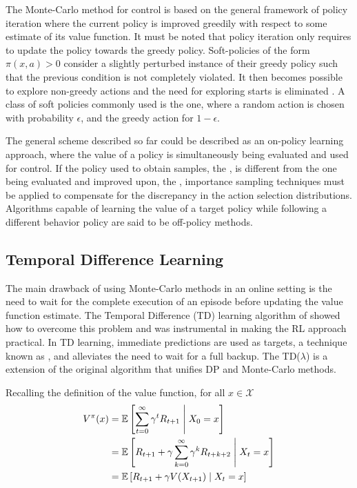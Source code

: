 The Monte-Carlo method for control is based on the general framework of policy
iteration where the current policy is improved greedily with respect to some
estimate of its value function. It must be noted that policy iteration only requires to update the policy
towards the greedy policy.  Soft-policies of the form $\pi(x, a) > 0$ consider a slightly perturbed instance
of their greedy policy such that the previous condition is not completely violated. It then becomes possible to explore non-greedy actions and the need for exploring starts is eliminated \parencite{SuttonBarto1998}. A class of soft policies commonly used is the  one, where a random action is chosen with probability $\epsilon$, and the greedy action for $1 - \epsilon$. 

The  general scheme described so far could be described as an on-policy learning approach,
where the value of a policy is simultaneously being evaluated and used for control.
If the policy used to obtain samples, the , is different from
the one being evaluated and improved upon, the ,
importance sampling techniques must be applied to compensate for the
discrepancy in the action selection distributions. Algorithms capable of learning the value of a target policy while following a different behavior policy are said to be off-policy methods.

\subsection{Temporal Difference Learning}
The main drawback of using Monte-Carlo methods in an online setting is
the need to wait for the complete execution of an episode before updating the value
function estimate. The Temporal Difference (TD) learning algorithm of \cite{Sutton1984} showed how to overcome this problem and was instrumental in making the RL approach practical. In TD learning, immediate predictions are used as targets, a technique known as
, and alleviates the need to wait for a full backup. The TD($\lambda$) is a extension of the original algorithm that unifies DP and Monte-Carlo methods.

Recalling the definition of the value function, for all $x \in \mathcal{X}$
\begin{align}
V^\pi(x) &= \operatorname{\mathbb{E}} \left[ \sum_{t=0}^\infty \gamma^t R_{t+1}  \;\middle\vert\;  X_0 =
x\right] \notag \\
&= \operatorname{\mathbb{E}} \left[ R_{t+1} + \gamma \sum_{k=0}^\infty \gamma^k
R_{t+k+2}\;\middle\vert\; X_t = x\right]  \notag \\
&= \operatorname{\mathbb{E}} \left[ R_{t+1} + \gamma V(X_{t+1}) \;\middle\vert\; X_t = x\right]
\label{eq:value-function-recursive}
\end{align}

